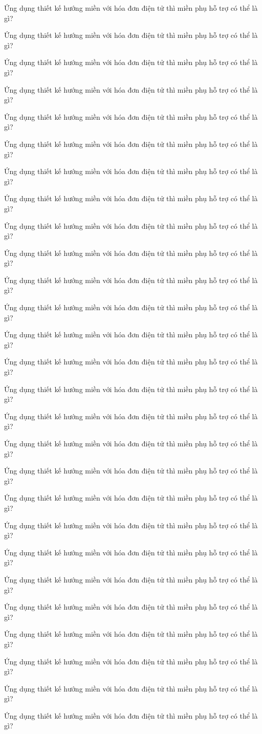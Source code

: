 Ứng dụng thiết kế hướng miền với hóa đơn điện tử thì miền phụ hỗ trợ có thể là gì?

Ứng dụng thiết kế hướng miền với hóa đơn điện tử thì miền phụ hỗ trợ có thể là gì?

Ứng dụng thiết kế hướng miền với hóa đơn điện tử thì miền phụ hỗ trợ có thể là gì?

Ứng dụng thiết kế hướng miền với hóa đơn điện tử thì miền phụ hỗ trợ có thể là gì?

Ứng dụng thiết kế hướng miền với hóa đơn điện tử thì miền phụ hỗ trợ có thể là gì?

Ứng dụng thiết kế hướng miền với hóa đơn điện tử thì miền phụ hỗ trợ có thể là gì?

Ứng dụng thiết kế hướng miền với hóa đơn điện tử thì miền phụ hỗ trợ có thể là gì?

Ứng dụng thiết kế hướng miền với hóa đơn điện tử thì miền phụ hỗ trợ có thể là gì?

Ứng dụng thiết kế hướng miền với hóa đơn điện tử thì miền phụ hỗ trợ có thể là gì?

Ứng dụng thiết kế hướng miền với hóa đơn điện tử thì miền phụ hỗ trợ có thể là gì?

Ứng dụng thiết kế hướng miền với hóa đơn điện tử thì miền phụ hỗ trợ có thể là gì?

Ứng dụng thiết kế hướng miền với hóa đơn điện tử thì miền phụ hỗ trợ có thể là gì?

Ứng dụng thiết kế hướng miền với hóa đơn điện tử thì miền phụ hỗ trợ có thể là gì?

Ứng dụng thiết kế hướng miền với hóa đơn điện tử thì miền phụ hỗ trợ có thể là gì?

Ứng dụng thiết kế hướng miền với hóa đơn điện tử thì miền phụ hỗ trợ có thể là gì?

Ứng dụng thiết kế hướng miền với hóa đơn điện tử thì miền phụ hỗ trợ có thể là gì?

Ứng dụng thiết kế hướng miền với hóa đơn điện tử thì miền phụ hỗ trợ có thể là gì?

Ứng dụng thiết kế hướng miền với hóa đơn điện tử thì miền phụ hỗ trợ có thể là gì?

Ứng dụng thiết kế hướng miền với hóa đơn điện tử thì miền phụ hỗ trợ có thể là gì?

Ứng dụng thiết kế hướng miền với hóa đơn điện tử thì miền phụ hỗ trợ có thể là gì?

Ứng dụng thiết kế hướng miền với hóa đơn điện tử thì miền phụ hỗ trợ có thể là gì?

Ứng dụng thiết kế hướng miền với hóa đơn điện tử thì miền phụ hỗ trợ có thể là gì?

Ứng dụng thiết kế hướng miền với hóa đơn điện tử thì miền phụ hỗ trợ có thể là gì?

Ứng dụng thiết kế hướng miền với hóa đơn điện tử thì miền phụ hỗ trợ có thể là gì?

Ứng dụng thiết kế hướng miền với hóa đơn điện tử thì miền phụ hỗ trợ có thể là gì?

Ứng dụng thiết kế hướng miền với hóa đơn điện tử thì miền phụ hỗ trợ có thể là gì?

Ứng dụng thiết kế hướng miền với hóa đơn điện tử thì miền phụ hỗ trợ có thể là gì?